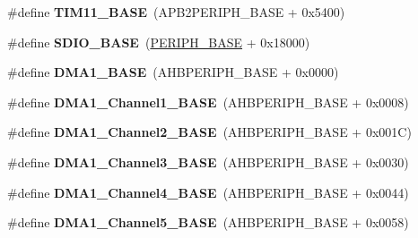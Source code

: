 \begin{DoxyCompactItemize}
\item 
\hypertarget{group___peripheral__memory__map_ga3a4a06bb84c703084f0509e105ffaf1d}{\#define {\bfseries T\-I\-M11\-\_\-\-B\-A\-S\-E}~(A\-P\-B2\-P\-E\-R\-I\-P\-H\-\_\-\-B\-A\-S\-E + 0x5400)}\label{group___peripheral__memory__map_ga3a4a06bb84c703084f0509e105ffaf1d}

\item 
\hypertarget{group___peripheral__memory__map_ga95dd0abbc6767893b4b02935fa846f52}{\#define {\bfseries S\-D\-I\-O\-\_\-\-B\-A\-S\-E}~(\hyperlink{group___peripheral__memory__map_ga9171f49478fa86d932f89e78e73b88b0}{P\-E\-R\-I\-P\-H\-\_\-\-B\-A\-S\-E} + 0x18000)}\label{group___peripheral__memory__map_ga95dd0abbc6767893b4b02935fa846f52}

\item 
\hypertarget{group___peripheral__memory__map_gab2d8a917a0e4ea99a22ac6ebf279bc72}{\#define {\bfseries D\-M\-A1\-\_\-\-B\-A\-S\-E}~(A\-H\-B\-P\-E\-R\-I\-P\-H\-\_\-\-B\-A\-S\-E + 0x0000)}\label{group___peripheral__memory__map_gab2d8a917a0e4ea99a22ac6ebf279bc72}

\item 
\hypertarget{group___peripheral__memory__map_ga888dbc1608243badeb3554ffedc7364c}{\#define {\bfseries D\-M\-A1\-\_\-\-Channel1\-\_\-\-B\-A\-S\-E}~(A\-H\-B\-P\-E\-R\-I\-P\-H\-\_\-\-B\-A\-S\-E + 0x0008)}\label{group___peripheral__memory__map_ga888dbc1608243badeb3554ffedc7364c}

\item 
\hypertarget{group___peripheral__memory__map_ga38a70090eef3687e83fa6ac0c6d22267}{\#define {\bfseries D\-M\-A1\-\_\-\-Channel2\-\_\-\-B\-A\-S\-E}~(A\-H\-B\-P\-E\-R\-I\-P\-H\-\_\-\-B\-A\-S\-E + 0x001\-C)}\label{group___peripheral__memory__map_ga38a70090eef3687e83fa6ac0c6d22267}

\item 
\hypertarget{group___peripheral__memory__map_ga70b3d9f36ca9ce95b4e421c11154fe5d}{\#define {\bfseries D\-M\-A1\-\_\-\-Channel3\-\_\-\-B\-A\-S\-E}~(A\-H\-B\-P\-E\-R\-I\-P\-H\-\_\-\-B\-A\-S\-E + 0x0030)}\label{group___peripheral__memory__map_ga70b3d9f36ca9ce95b4e421c11154fe5d}

\item 
\hypertarget{group___peripheral__memory__map_ga1adc93cd0baf0897202c71110e045692}{\#define {\bfseries D\-M\-A1\-\_\-\-Channel4\-\_\-\-B\-A\-S\-E}~(A\-H\-B\-P\-E\-R\-I\-P\-H\-\_\-\-B\-A\-S\-E + 0x0044)}\label{group___peripheral__memory__map_ga1adc93cd0baf0897202c71110e045692}

\item 
\hypertarget{group___peripheral__memory__map_gac041a71cd6c1973964f847a68aa14478}{\#define {\bfseries D\-M\-A1\-\_\-\-Channel5\-\_\-\-B\-A\-S\-E}~(A\-H\-B\-P\-E\-R\-I\-P\-H\-\_\-\-B\-A\-S\-E + 0x0058)}\label{group___peripheral__memory__map_gac041a71cd6c1973964f847a68aa14478}


\end{DoxyCompactItemize}
